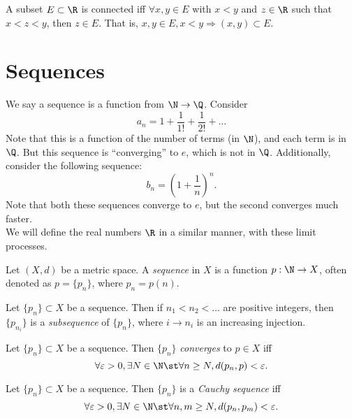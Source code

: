 \documentclass{notes}
\begin{document}
\begin{theorem}
  A subset $E\subset\R$ is connected iff $\forall x,y\in E$ with $x < y$ and $z\in\R$ such that 
  $x < z < y$, then $z\in E$. That is, $x,y\in E, x < y \Rightarrow (x,y)\subset E$.
\end{theorem}

\section{Sequences}
We say a sequence is a function from $\N\to\Q$. Consider $$a_n = 1 + \frac{1}{1!} + \frac{1}{2!} + \ldots$$ 
Note that this is a function of the number of terms (in $\N$), and each term is in $\Q$. But this sequence
is ``converging'' to $e$, which is not in $\Q$. Additionally, consider the following sequence:
$$b_n = (1 + \frac{1}{n})^n.$$
Note that both these sequences converge to $e$, but the second converges much faster.\\

We will define the real numbers $\R$ in a similar manner, with these limit processes. \\

\begin{defn}
  Let $(X,d)$ be a metric space. A \emph{sequence} in $X$ is a function $p: \N\to X$, often denoted
  as $p = \{p_n\}$, where $p_n = p(n)$.
\end{defn}

\begin{defn}
  Let $\{p_n\} \subset X$ be a sequence. Then if $n_1< n_2< \ldots$ are positive integers, then 
  $\{p_{n_i}\}$ is a \emph{subsequence} of $\{p_n\}$, where $i\to n_i$ is an increasing injection.
\end{defn}

\begin{defn}
  Let $\{p_n\}\subset X$ be a sequence. Then $\{p_n\}$ \emph{converges} to $p\in X$ iff
  $$\forall \varepsilon > 0, \exists N\in\N \st \forall n\geq N, d(p_n, p) < \varepsilon.$$
\end{defn}

\begin{defn}
  Let $\{p_n\}\subset X$ be a sequence. Then $\{p_n\}$ is a \emph{Cauchy sequence} iff 
  $$\forall \varepsilon > 0, \exists N\in\N \st \forall n,m \geq N, d(p_n, p_m) < \varepsilon.$$
\end{defn}
\end{document}
